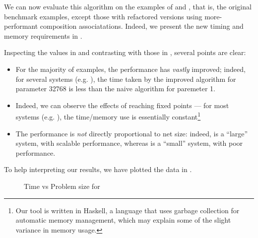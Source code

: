 We can now evaluate this algorithm on the examples of
 and , that is, the original
benchmark examples, except those with refactored versions using more-performant
composition associatations. Indeed, we present the new timing and memory
requirements in .



Inspecting the values in  and contrasting with those in
, several points are clear:

\begin{itemize}
    \item For the majority of examples, the performance has \emph{vastly}
        improved; indeed, for several systems (e.g. \overtakeSys{-}), the time
        taken by the improved algorithm for parameter 32768 is less
        than the naive algorithm for paremeter 1.
    \item Indeed, we can observe the effects of reaching fixed points --- for
        most systems (e.g. \bufferSys{-}), the time/memory use is essentially
        constant\footnote{Our tool is written in Haskell, a language that uses
            garbage collection for automatic memory management, which may
            explain some of the slight variance in memory usage.}
    \item The performance is \emph{not} directly proportional to net size:
        indeed, \overtakeSys{-} is a ``large'' system, with scalable
        performance, whereas \counterSys{-} is a ``small'' system, with poor
        performance.
\end{itemize}

To help interpreting our results, we have plotted the data in
.

\begin{figure}[ht]
\centering
{}
\caption{Time vs Problem size for }
\label{fig:penrosetimes}
\end{figure}
